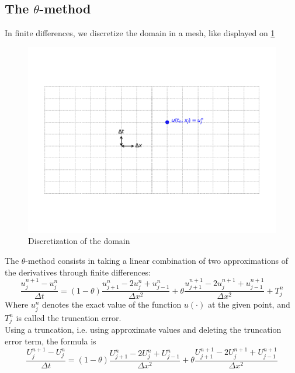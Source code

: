 \documentclass[12pt, openany]{report}
\theoremstyle{definition}
\begin{document}
\subsection{The $\theta$-method}
In finite differences, we discretize the domain in a mesh, like displayed on \ref{fig:finite_diff}
\begin{figure}[H]
	\centering
	\includegraphics[width = .7\textwidth]{img/finite_diff.pdf}
	\caption{Discretization of the domain}
	\label{fig:finite_diff}
\end{figure}
The $\theta$-method consists in taking a linear combination of two approximations of the derivatives through finite differences:
\begin{equation}
	\frac{u_j^{n+1}-u_j^n}{\Delta t} = (1-\theta)\frac{u_{j+1}^n-2u_j^n+u_{j-1}^n}{\Delta x^2} + \theta \frac{u_{j+1}^{n+1}-2u_{j}^{n+1}+u_{j-1}^{n+1}}{\Delta x^2} + T_j^n
\end{equation}
Where $u_j^n$ denotes the exact value of the function $u(\cdot)$ at the given point, and $T_j^n$ is called the truncation error.\\
Using a truncation, i.e. using approximate values and deleting the truncation error term, the formula is 
\begin{equation}\label{eq:theta}
	\frac{U_j^{n+1}-U_j^n}{\Delta t} = (1-\theta)\frac{U_{j+1}^n-2U_j^n+U_{j-1}^n}{\Delta x^2} + \theta \frac{U_{j+1}^{n+1}-2U_{j}^{n+1}+U_{j-1}^{n+1}}{\Delta x^2}
\end{equation}
\end{document}
